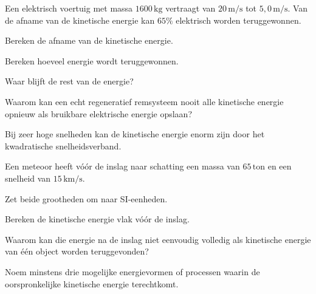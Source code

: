 \documentclass{ximera}
\begin{document}
\begin{oefening}{\oefU}

Een elektrisch voertuig met massa $1600\,\mathrm{kg}$ vertraagt van
$20\,\mathrm{m/s}$ tot $5{,}0\,\mathrm{m/s}$. Van de afname van de kinetische
energie kan $65\%$ elektrisch worden teruggewonnen.

\begin{question}
Bereken de afname van de kinetische energie.
\end{question}

\begin{question}
Bereken hoeveel energie wordt teruggewonnen.
\end{question}

\begin{question}
Waar blijft de rest van de energie?
\end{question}

\begin{question}
Waarom kan een echt regeneratief remsysteem nooit alle kinetische energie
opnieuw als bruikbare elektrische energie opslaan?
\end{question}

\end{oefening}



Bij zeer hoge snelheden kan de kinetische energie enorm zijn door het
kwadratische snelheidsverband.

\begin{oefening}[Barringerkrater]{\oefB}

Een meteoor heeft vóór de inslag naar schatting een massa van
$65\,\mathrm{ton}$ en een snelheid van $15\,\mathrm{km/s}$.

\begin{question}
Zet beide grootheden om naar SI-eenheden.
\end{question}

\begin{question}
Bereken de kinetische energie vlak vóór de inslag.
\end{question}

\begin{question}
Waarom kan die energie na de inslag niet eenvoudig volledig als kinetische
energie van één object worden teruggevonden?
\end{question}

\begin{question}
Noem minstens drie mogelijke energievormen of processen waarin de
oorspronkelijke kinetische energie terechtkomt.
\end{question}

\end{oefening}
\end{document}
